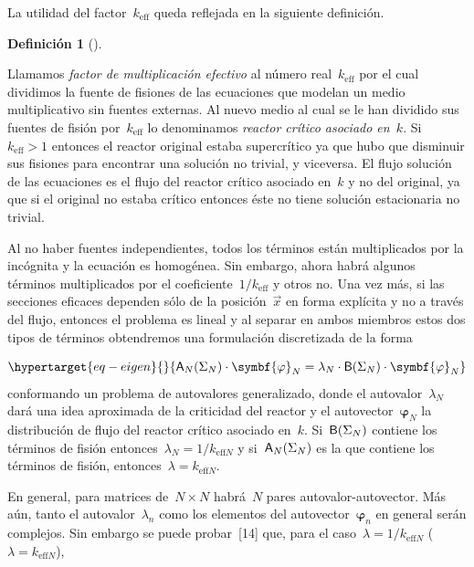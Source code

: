 \documentclass[
  12pt,
  a4paper,
  table]{scrbook}
\theoremstyle{plain}
\theoremstyle{definition}
\newtheorem{definition}{Definición}[chapter]
\theoremstyle{plain}
\theoremstyle{plain}
\theoremstyle{remark}
\begin{document}
La utilidad del factor~\(k_\text{eff}\) queda reflejada en la siguiente
definición.

\begin{definition}[]\protect\hypertarget{def-keff}{}\label{def-keff}

Llamamos \emph{factor de multiplicación efectivo} al número
real~\(k_\text{eff}\) por el cual dividimos la fuente de fisiones de las
ecuaciones que modelan un medio multiplicativo sin fuentes externas. Al
nuevo medio al cual se le han dividido sus fuentes de fisión
por~\(k_\text{eff}\) lo denominamos \emph{reactor crítico asociado
en~\(k\)}. Si~\(k_\text{eff}>1\) entonces el reactor original estaba
supercrítico ya que hubo que disminuir sus fisiones para encontrar una
solución no trivial, y viceversa. El flujo solución de las ecuaciones es
el flujo del reactor crítico asociado en~\(k\) y no del original, ya que
si el original no estaba crítico entonces éste no tiene solución
estacionaria no trivial.

\end{definition}

Al no haber fuentes independientes, todos los términos están
multiplicados por la incógnita y la ecuación es homogénea. Sin embargo,
ahora habrá algunos términos multiplicados por el
coeficiente~\(1/k_\text{eff}\) y otros no. Una vez más, si las secciones
eficaces dependen sólo de la posición~\(\vec{x}\) en forma explícita y
no a través del flujo, entonces el problema es lineal y al separar en
ambos miembros estos dos tipos de términos obtendremos una formulación
discretizada de la forma

\begin{equation}\protect\hypertarget{eq-eigen}{}{
\mat{A}_N(\Sigma_N) \cdot \symbf{\varphi}_N = \lambda_N \cdot \mat{B}(\Sigma_N) \cdot \symbf{\varphi}_N
}\label{eq-eigen}\end{equation} conformando un problema de autovalores
generalizado, donde el autovalor~\(\lambda_N\) dará una idea aproximada
de la criticidad del reactor y el autovector~\(\symbf{\varphi}_N\) la
distribución de flujo del reactor crítico asociado en~\(k\).
Si~\(\mathsf{B}(\Sigma_N)\) contiene los términos de fisión
entonces~\(\lambda_N = 1/k_{\text{eff}N}\) y si~\(\mathsf{A}_N(\Sigma_N)\)
es la que contiene los términos de fisión,
entonces~\(\lambda = k_{\text{eff}N}\).

En general, para matrices de~\(N \times N\) habrá~\(N\) pares
autovalor-autovector. Más aún, tanto el autovalor~\(\lambda_n\) como los
elementos del autovector~\(\symbf{\varphi}_n\) en general serán
complejos. Sin embargo se puede probar~{[}14{]} que, para el
caso~\(\lambda=1/k_{\text{eff}N}\) (\(\lambda=k_{\text{eff}N}\)),
\end{document}
